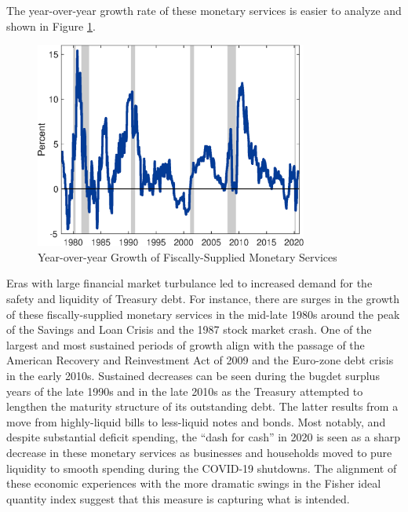 \documentclass[11pt,a4paper,margin=1.5in]{article}
\begin{document}
The year-over-year growth rate of these monetary services is easier to analyze and shown in Figure \ref{fig:YoY_Growth}.
\begin{figure}[p]
	\centering
	\includegraphics[width=0.8\textwidth]{../Figures/YoYGrowth_MonServices.eps}
	\caption{Year-over-year Growth of Fiscally-Supplied Monetary Services}
	\label{fig:YoY_Growth}
\end{figure}
Eras with large financial market turbulance led to increased demand for the safety and liquidity of Treasury debt.
For instance, there are surges in the growth of these fiscally-supplied monetary services in the mid-late 1980s around the peak of the Savings and Loan Crisis and the 1987 stock market crash.
One of the largest and most sustained periods of growth align with the passage of the American Recovery and Reinvestment Act of 2009 and the Euro-zone debt crisis in the early 2010s.
Sustained decreases can be seen during the bugdet surplus years of the late 1990s and in the late 2010s as the Treasury attempted to lengthen the maturity structure of its outstanding debt.
The latter results from a move from highly-liquid bills to less-liquid notes and bonds.
Most notably, and despite substantial deficit spending, the ``dash for cash'' in 2020 is seen as a sharp decrease in these monetary services as businesses and households moved to pure liquidity to smooth spending during the COVID-19 shutdowns.
The alignment of these economic experiences with the more dramatic swings in the Fisher ideal quantity index suggest that this measure is capturing what is intended.


\end{document}
